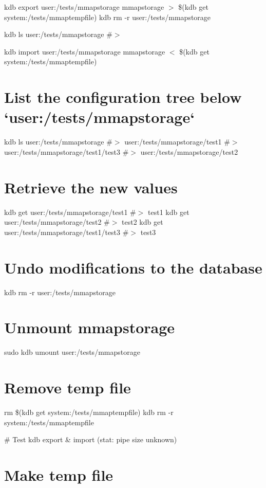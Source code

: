 kdb export user\+:/tests/mmapstorage mmapstorage $>$ \$(kdb get system\+:/tests/mmaptempfile) kdb rm -\/r user\+:/tests/mmapstorage

kdb ls user\+:/tests/mmapstorage \#$>$

kdb import user\+:/tests/mmapstorage mmapstorage $<$ \$(kdb get system\+:/tests/mmaptempfile)\hypertarget{autotoc_md417_autotoc_md424}{}\section{List the configuration tree below `user\+:/tests/mmapstorage`}\label{autotoc_md417_autotoc_md424}
kdb ls user\+:/tests/mmapstorage \#$>$ user\+:/tests/mmapstorage/test1 \#$>$ user\+:/tests/mmapstorage/test1/test3 \#$>$ user\+:/tests/mmapstorage/test2\hypertarget{autotoc_md417_autotoc_md425}{}\section{Retrieve the new values}\label{autotoc_md417_autotoc_md425}
kdb get user\+:/tests/mmapstorage/test1 \#$>$ test1 kdb get user\+:/tests/mmapstorage/test2 \#$>$ test2 kdb get user\+:/tests/mmapstorage/test1/test3 \#$>$ test3\hypertarget{autotoc_md417_autotoc_md426}{}\section{Undo modifications to the database}\label{autotoc_md417_autotoc_md426}
kdb rm -\/r user\+:/tests/mmapstorage\hypertarget{autotoc_md417_autotoc_md427}{}\section{Unmount mmapstorage}\label{autotoc_md417_autotoc_md427}
sudo kdb umount user\+:/tests/mmapstorage\hypertarget{autotoc_md417_autotoc_md428}{}\section{Remove temp file}\label{autotoc_md417_autotoc_md428}
rm \$(kdb get system\+:/tests/mmaptempfile) kdb rm -\/r system\+:/tests/mmaptempfile 
\begin{DoxyCode}
# Test kdb export & import (stat: pipe size unknown)
\end{DoxyCode}
 \hypertarget{autotoc_md417_autotoc_md429}{}\section{Make temp file}\label{autotoc_md417_autotoc_md429}

